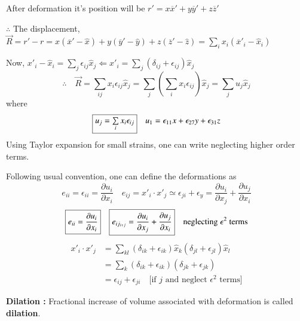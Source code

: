 After deformation it's position will be $r'=x\overline{x}'+y\overline{y}'+z\overline{z}'$

$\therefore$ The displacement, $\overrightarrow{R}=r'-r=x(\overline{x}'-\widehat{x})+y(\overline{y}'-\widehat{y})+z(\overline{z}'-\widehat{z})=\sum\limits_{i}x_{i}(\overline{x}'_{i}-\widehat{x}_{i})$

Now, $x'_{i}-\widehat{x}_{i}=\sum\limits_{j}\epsilon_{ij}\widehat{x}_{j}\Leftarrow x'_{i}=\sum\limits_{j}(\delta_{ij}+\epsilon_{ij})\widehat{x}_{j}$
$$
\therefore\quad \overrightarrow{R}=\sum\limits_{ij}x_{i}\epsilon_{ij}\widehat{x}_{j}=\sum\limits_{j}\left(\sum\limits_{i}x_{i}\epsilon_{ij}\right)\widehat{x}_{j}=\sum\limits_{j}u_{j}\widehat{x}_{j}
$$
where
$$
\fbox{$u_{j}=\sum\limits_{i}x_{i}\epsilon_{ij}$}\quad u_{1}=\epsilon_{11}x+\epsilon_{27}y+\epsilon_{31}z
$$
Using Taylor expansion for small strains, one can write  neglecting higher order terms.

Following usual convention, one can define the deformations as
$$
e_{ii}=\epsilon_{ii}=\dfrac{\partial u_{i}}{\partial x_{i}}\quad e_{ij}=x'_{i}\cdot x'_{j}\simeq \epsilon_{ji}+\epsilon_{y}=\dfrac{\partial u_{i}}{\partial x_{j}}+\dfrac{\partial u_{j}}{\partial x_{i}}
$$
$$
\fbox{$e_{ii}=\dfrac{\partial u_{i}}{\partial x_{i}}$}\quad \fbox{$e_{ij_{i+j}}=\dfrac{\partial u_{i}}{\partial x_{j}}+\dfrac{\partial u_{j}}{\partial x_{i}}$}\quad \text{neglecting $\epsilon^{2}$ terms}
$$
\begin{align*}
x'_{i}\cdot x'_{j} &= \sum\limits_{kl}(\delta_{ik}+\epsilon_{ik})\widehat{x}_{k}(\delta_{jl}+\epsilon_{jl})\widehat{x}_{l}\\
&= \sum\limits_{k}(\delta_{ik}+\epsilon_{ik})(\delta_{jk}+\epsilon_{jk})\\
&= \epsilon_{ij}+\epsilon_{ji}\quad\text{[if $j$ and neglect $\epsilon^{2}$ terms]}
\end{align*}

\noindent
{\bf Dilation :} Fractional increase of volume associated with deformation is called {\bf dilation}.

